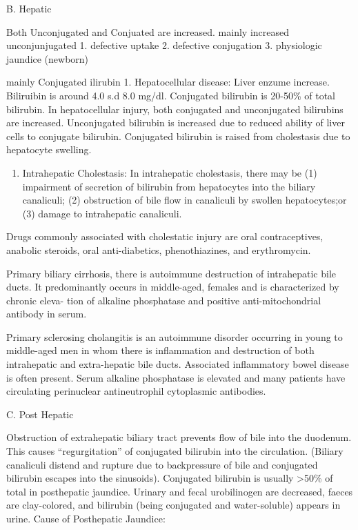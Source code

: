 \documentclass[
  letterpaper,
  DIV=11,
  numbers=noendperiod]{scrreprt}
\providecommand{\tightlist}{%
  \setlength{\itemsep}{0pt}\setlength{\parskip}{0pt}}\usepackage{longtable,booktabs,array}
\begin{document}
B. Hepatic

Both Unconjugated and Conjuated are increased. mainly increased
unconjunjugated 1. defective uptake 2. defective conjugation 3.
physiologic jaundice (newborn)

mainly Conjugated ilirubin 1. Hepatocellular disease: Liver enzume
increase. Biliruibin is around 4.0 s.d 8.0 mg/dl. Conjugated bilirubin
is 20-50\% of total bilirubin. In hepatocellular injury, both conjugated
and unconjugated bilirubins are increased. Unconjugated bilirubin is
increased due to reduced ability of liver cells to conjugate bilirubin.
Conjugated bilirubin is raised from cholestasis due to hepatocyte
swelling.

\begin{enumerate}
\def\labelenumi{\arabic{enumi}.}
\setcounter{enumi}{1}
\tightlist
\item
  Intrahepatic Cholestasis: In intrahepatic cholestasis, there may be
  (1) impairment of secretion of bilirubin from hepatocytes into the
  biliary canaliculi; (2) obstruction of bile flow in canaliculi by
  swollen hepatocytes;or (3) damage to intrahepatic canaliculi.
\end{enumerate}

Drugs commonly associated with cholestatic injury are oral
contraceptives, anabolic steroids, oral anti-diabetics, phenothiazines,
and erythromycin.

Primary biliary cirrhosis, there is autoimmune destruction of
intrahepatic bile ducts. It predominantly occurs in middle-aged, females
and is characterized by chronic eleva- tion of alkaline phosphatase and
positive anti-mitochondrial antibody in serum.

Primary sclerosing cholangitis is an autoimmune disorder occurring in
young to middle-aged men in whom there is inflammation and destruction
of both intrahepatic and extra-hepatic bile ducts. Associated
inflammatory bowel disease is often present. Serum alkaline phosphatase
is elevated and many patients have circulating perinuclear
antineutrophil cytoplasmic antibodies.

C. Post Hepatic

Obstruction of extrahepatic biliary tract prevents flow of bile into the
duodenum. This causes ``regurgitation'' of conjugated bilirubin into the
circulation. (Biliary canaliculi distend and rupture due to backpressure
of bile and conjugated bilirubin escapes into the sinusoids). Conjugated
bilirubin is usually \textgreater50\% of total in posthepatic jaundice.
Urinary and fecal urobilinogen are decreased, faeces are clay-colored,
and bilirubin (being conjugated and water-soluble) appears in urine.
Cause of Posthepatic Jaundice:
\end{document}
